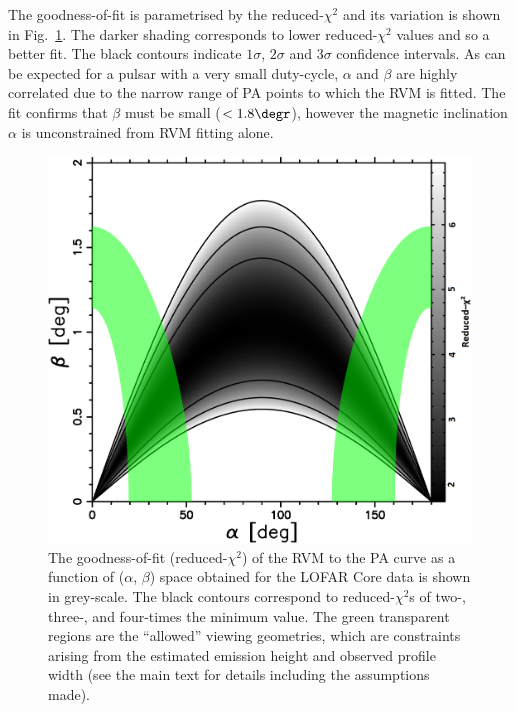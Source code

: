 The goodness-of-fit is parametrised by the reduced-$\chi^2$ and its variation is shown in Fig.~\ref{fig: banana}. The darker shading corresponds to lower reduced-$\chi^2$ values and so a better fit. The black contours indicate $1\sigma$, $2\sigma$ and $3\sigma$ confidence intervals. As can be expected for a pulsar with a very small duty-cycle, $\alpha$ and $\beta$ are highly correlated due to the narrow range of PA points to which the RVM is fitted. The fit confirms that $\beta$ must be small ($<1.8\degr$), however the magnetic inclination $\alpha$ is unconstrained from RVM fitting alone.
\begin{figure}
    \includegraphics[width=\columnwidth]{Figures/J0250/banana.png}
    \caption[The goodness-of-fit of the RVM to the PA curve of PSR~J0250+5854]{The goodness-of-fit (reduced-$\chi^2$) of the RVM to the PA curve as a function of ($\alpha$, $\beta$) space obtained for the LOFAR Core data is shown in grey-scale. The black contours correspond to reduced-$\chi^2$s of two-, three-, and four-times the minimum value. The green transparent regions are the ``allowed'' viewing geometries, which are constraints arising from the estimated emission height and observed profile width (see the main text for details including the assumptions made).}
    \label{fig: banana}
\end{figure}

